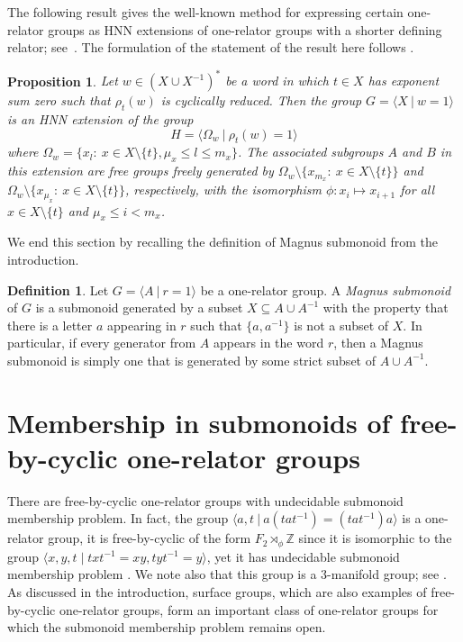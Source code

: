 \documentclass[11pt]{amsart}
\newcommand{\Gpres}[2]{\bigl\langle #1\:|\:#2 \bigr\rangle}
\theoremstyle{plain}
\newtheorem{prop}[theorem]{Proposition}
\theoremstyle{definition}
\newtheorem{mydef}[theorem]{Definition}
\begin{document}
The following result gives the well-known method for expressing certain one-relator groups as HNN extensions of one-relator groups with a shorter defining relator;  
see~\cite[Page 198]{lyndon1977combinatorial}. The formulation of the statement of the result here follows \cite[Proposition~7.1]{dolinka2021new}. 

\begin{prop}\label{pro:mol}
Let $w\in (X \cup X^{-1})^*$ be a word in which $t\in X$ has exponent sum zero such that $\rho_t(w)$ is cyclically reduced. Then 
the group $G=\Gpres{X}{w=1}$ is an HNN extension of the group 
$$
H = \Gpres{\Omega_w}{\rho_t(w)=1}
$$
where $\Omega_w=\{x_l:\ x\in X\setminus\{t\}, \mu_x\leq l\leq m_x\}$. The associated subgroups $A$ and $B$ in this extension
are free groups freely generated by $\Omega_w\setminus\{x_{m_x}:\ x\in X\setminus\{t\}\}$ and $\Omega_w\setminus
\{x_{\mu_x}:\ x\in X\setminus\{t\}\}$, respectively, with the isomorphism $\phi:x_i\mapsto x_{i+1}$ for all $x\in X\setminus\{t\}$
and $\mu_x\leq i<m_x$.
\end{prop}
We end this section by recalling the definition of Magnus submonoid from the introduction. 
   
\begin{mydef}
Let $G = \Gpres{A}{r=1}$ be a one-relator group. A \emph{Magnus submonoid} of $G$ is a submonoid generated by a subset $X \subseteq A \cup A^{-1}$ with the property that there is a letter $a$ appearing in $r$ such that $\{a,a^{-1}\}$ is not a subset of $X$. In particular, if every generator from $A$ appears in the word $r$, then a Magnus submonoid is simply one that is generated by some strict subset of $A \cup A^{-1}$. 
\end{mydef}



\section{Membership in submonoids of free-by-cyclic one-relator groups}\label{sec: Main Theorem}

There are free-by-cyclic one-relator groups with undecidable submonoid membership problem. In fact, the group $\Gpres{a,t}{a(tat^{-1}) = (tat^{-1})a}$ is a one-relator group, it is free-by-cyclic of the form $F_2 \rtimes_\phi \mathbb{Z}$ since it is isomorphic to the group $\langle x, y, t \mid txt^{-1} = xy, tyt^{-1} = y \rangle$, yet it has undecidable submonoid membership problem \cite{Burns1987, gray2020undecidability}. We note also that this group is a 3-manifold group; see \cite{niblo2001}. As discussed in the introduction, surface groups, which are also examples of free-by-cyclic one-relator groups, form an important class of one-relator groups for which the submonoid membership problem remains open.
\end{document}
